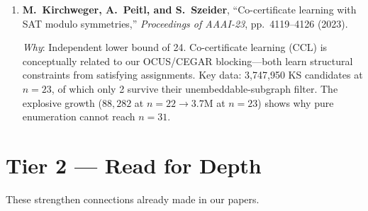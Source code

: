 \documentclass[11pt,a4paper]{article}
\begin{document}
\begin{enumerate}[label=\textbf{\arabic*.}, leftmargin=2em]
\bigskip

\item \textbf{M.~Kirchweger, A.~Peitl, and S.~Szeider},
``Co-certificate learning with SAT modulo symmetries,''
\textit{Proceedings of AAAI-23}, pp.~4119--4126 (2023).

\smallskip\noindent
\textit{Why}: Independent lower bound of 24.  Co-certificate learning (CCL) is conceptually related to our OCUS/CEGAR blocking---both learn structural constraints from satisfying assignments.  Key data: 3{,}747{,}950 KS candidates at $n = 23$, of which only 2 survive their unembeddable-subgraph filter.  The explosive growth ($88{,}282$ at $n = 22 \to 3.7$M at $n = 23$) shows why pure enumeration cannot reach $n = 31$.

\end{enumerate}

\bigskip

\section*{\textcolor{tier2}{Tier 2 --- Read for Depth}}

These strengthen connections already made in our papers.
\end{document}
